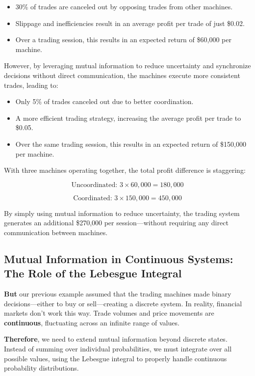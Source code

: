 \begin{itemize}
    \item 30\% of trades are canceled out by opposing trades from other machines.  
    \item Slippage and inefficiencies result in an average profit per trade of just \$0.02.  
    \item Over a trading session, this results in an expected return of \$60,000 per machine.  
\end{itemize}

However, by leveraging mutual information to reduce uncertainty and synchronize decisions without direct communication, the machines execute more consistent trades, leading to:  

\begin{itemize}
    \item Only 5\% of trades canceled out due to better coordination.  
    \item A more efficient trading strategy, increasing the average profit per trade to \$0.05.  
    \item Over the same trading session, this results in an expected return of \$150,000 per machine.  
\end{itemize}

With three machines operating together, the total profit difference is staggering:  

\[
\text{Uncoordinated: } 3 \times 60,000 = 180,000
\]

\[
\text{Coordinated: } 3 \times 150,000 = 450,000
\]

By simply using mutual information to reduce uncertainty, the trading system generates an additional \$270,000 per session—without requiring any direct communication between machines.  


\subsection{Mutual Information in Continuous Systems: The Role of the Lebesgue Integral}

\textbf{But} our previous example assumed that the trading machines made binary decisions—either to buy or sell—creating a discrete system. In reality, financial markets don’t work this way. Trade volumes and price movements are \textbf{continuous}, fluctuating across an infinite range of values.  

\textbf{Therefore}, we need to extend mutual information beyond discrete states. Instead of summing over individual probabilities, we must integrate over all possible values, using the Lebesgue integral to properly handle continuous probability distributions.

